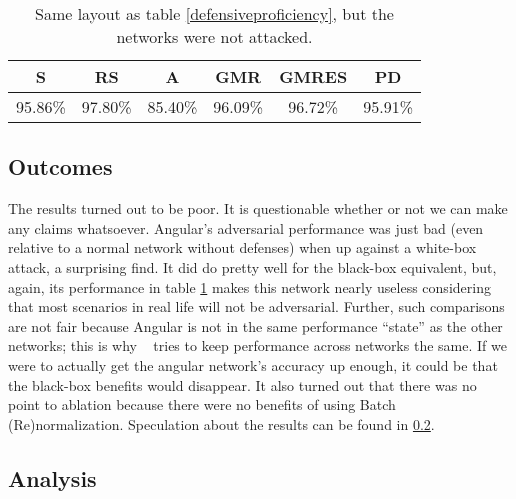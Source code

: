 \begin{table}
    \begin{center}
        \begin{tabular}{| c | c | c | c | c | c |}
            \hline
            S        &     RS    &     A     &   GMR    &   GMRES   &   PD     \\
            \hline
            95.86\%  &  97.80\%  &  85.40\%  &  96.09\% &  96.72\%  &  95.91\% \\
            \hline
        \end{tabular}
    \end{center}
    \caption{Same layout as table \ref{defensiveproficiency}, but the networks were not attacked.}
    \label{clean}
\end{table}

\subsection{Outcomes}

The results turned out to be poor. It is questionable whether or not we can make any claims
whatsoever. Angular's adversarial performance was just bad (even relative to a normal network
without defenses) when up against a white-box attack, a surprising find. It did do pretty well for
the black-box equivalent, but, again, its performance in table \ref{clean} makes this network nearly
useless considering that most scenarios in real life will not be adversarial. Further, such
comparisons are not fair because Angular is not in the same performance ``state'' as the other
networks; this is why ~\cite{szegedy2014intriguing} tries to keep performance across networks the
same. If we were to actually get the angular network's accuracy up enough, it could be that the
black-box benefits would disappear. It also turned out that there was no point to ablation because
there were no benefits of using Batch (Re)normalization. Speculation about the results can be found
in \ref{analysis}.


\subsection{Analysis}
\label{analysis}

